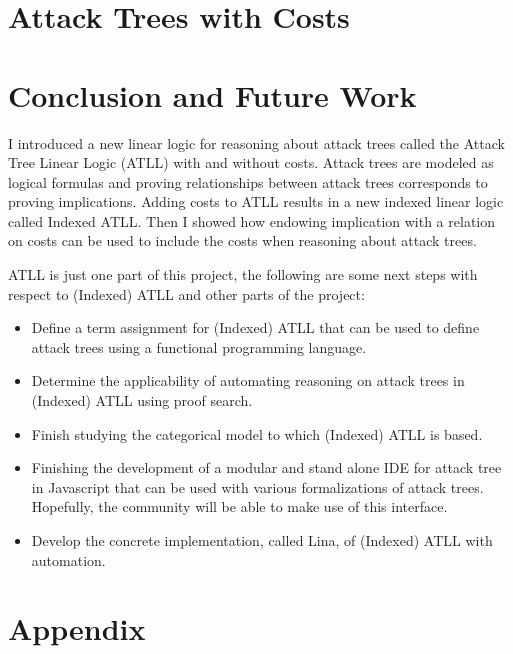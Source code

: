 \documentclass{llncs}
\begin{document}
\section{Attack Trees with Costs}
\label{sec:attack_trees_with_costs}


\section{Conclusion and Future Work}
\label{sec:conclusion}
I introduced a new linear logic for reasoning about attack trees
called the Attack Tree Linear Logic (ATLL) with and without costs.
Attack trees are modeled as logical formulas and proving relationships
between attack trees corresponds to proving implications.  Adding
costs to ATLL results in a new indexed linear logic called Indexed
ATLL.  Then I showed how endowing implication with a relation on costs
can be used to include the costs when reasoning about attack trees.

ATLL is just one part of this project, the following are some next
steps with respect to (Indexed) ATLL and other parts of the project:
\begin{itemize}
\item Define a term assignment for (Indexed) ATLL that can be used to
  define attack trees using a functional programming language.
\item Determine the applicability of automating reasoning on attack
  trees in (Indexed) ATLL using proof search.  
\item Finish studying the categorical model to which (Indexed) ATLL is
  based.
\item Finishing the development of a modular and stand alone IDE for
  attack tree in Javascript that can be used with various
  formalizations of attack trees.  Hopefully, the community will
  be able to make use of this interface.
\item Develop the concrete implementation, called Lina, of (Indexed)
  ATLL with automation.
\end{itemize}





\appendix

\section*{Appendix}
\label{sec:appendix}

\end{document}
